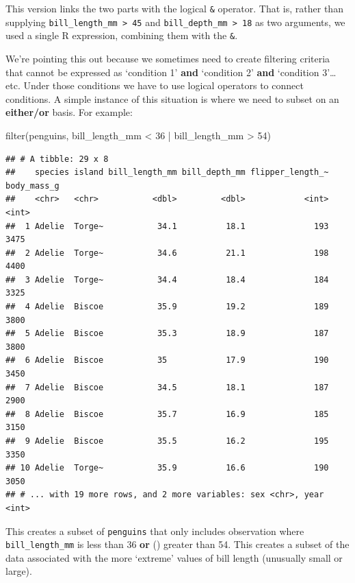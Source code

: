 \documentclass[
]{book}
\newenvironment{Shaded}{\begin{snugshade}}{\end{snugshade}}
\newcommand{\DecValTok}[1]{\textcolor[rgb]{0.00,0.00,0.81}{#1}}
\newcommand{\FunctionTok}[1]{\textcolor[rgb]{0.00,0.00,0.00}{#1}}
\newcommand{\NormalTok}[1]{#1}
\newcommand{\SpecialCharTok}[1]{\textcolor[rgb]{0.00,0.00,0.00}{#1}}
\begin{document}
This version links the two parts with the logical \texttt{\&} operator. That is, rather than supplying \texttt{bill\_length\_mm\ \textgreater{}\ 45} and \texttt{bill\_depth\_mm\ \textgreater{}\ 18} as two arguments, we used a single R expression, combining them with the \texttt{\&}.

We're pointing this out because we sometimes need to create filtering criteria that cannot be expressed as `condition 1' \textbf{and} `condition 2' \textbf{and} `condition 3'\ldots{} etc. Under those conditions we have to use logical operators to connect conditions. A simple instance of this situation is where we need to subset on an \textbf{either/or} basis. For example:

\begin{Shaded}
\begin{Highlighting}[]
\FunctionTok{filter}\NormalTok{(penguins, bill\_length\_mm }\SpecialCharTok{\textless{}} \DecValTok{36} \SpecialCharTok{|}\NormalTok{ bill\_length\_mm }\SpecialCharTok{\textgreater{}} \DecValTok{54}\NormalTok{)}
\end{Highlighting}
\end{Shaded}

\begin{verbatim}
## # A tibble: 29 x 8
##    species island bill_length_mm bill_depth_mm flipper_length_~ body_mass_g
##    <chr>   <chr>           <dbl>         <dbl>            <int>       <int>
##  1 Adelie  Torge~           34.1          18.1              193        3475
##  2 Adelie  Torge~           34.6          21.1              198        4400
##  3 Adelie  Torge~           34.4          18.4              184        3325
##  4 Adelie  Biscoe           35.9          19.2              189        3800
##  5 Adelie  Biscoe           35.3          18.9              187        3800
##  6 Adelie  Biscoe           35            17.9              190        3450
##  7 Adelie  Biscoe           34.5          18.1              187        2900
##  8 Adelie  Biscoe           35.7          16.9              185        3150
##  9 Adelie  Biscoe           35.5          16.2              195        3350
## 10 Adelie  Torge~           35.9          16.6              190        3050
## # ... with 19 more rows, and 2 more variables: sex <chr>, year <int>
\end{verbatim}

This creates a subset of \texttt{penguins} that only includes observation where \texttt{bill\_length\_mm} is less than 36 \textbf{or} (\texttt{\textbar{}}) greater than 54. This creates a subset of the data associated with the more `extreme' values of bill length (unusually small or large).
\end{document}
